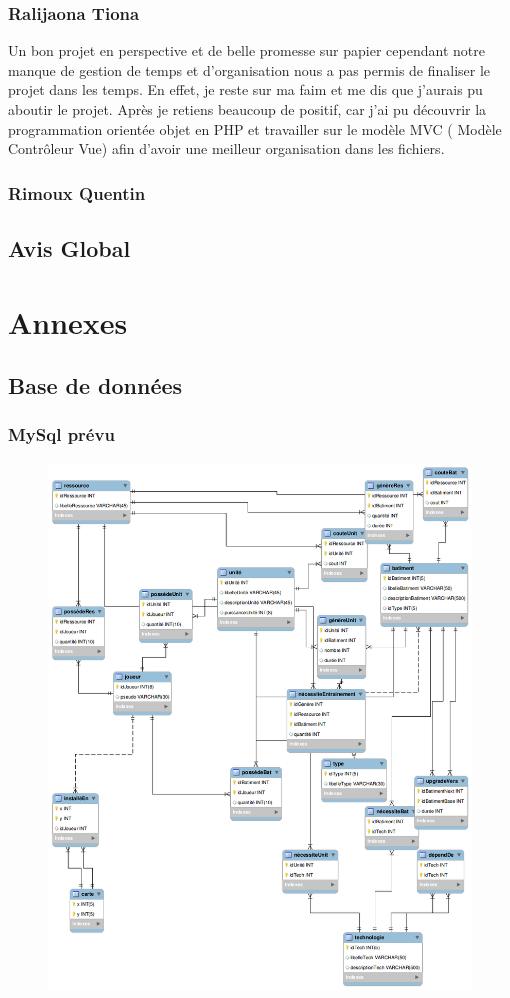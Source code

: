 \documentclass[11pt,a4paper]{article}
\begin{document}
\subsubsection{Ralijaona Tiona}
Un bon projet en perspective et de belle promesse sur papier cependant notre manque de gestion de temps et d'organisation nous a pas permis de finaliser le projet dans les temps. En effet, je reste sur ma faim et me dis que j'aurais pu aboutir le projet. Après je retiens beaucoup de positif, car j'ai pu découvrir la programmation orientée objet en PHP et travailler sur le modèle MVC ( Modèle Contrôleur Vue) afin d'avoir une meilleur organisation dans les fichiers. 
\subsubsection{Rimoux Quentin}
\subsection{Avis Global}

\newpage{}
\section{Annexes}
\subsection{Base de données}
\subsubsection{MySql prévu}
\begin{figure}[!h]
\includegraphics[scale=0.3]{./sql/last.png}
\end{figure}
\end{document}
